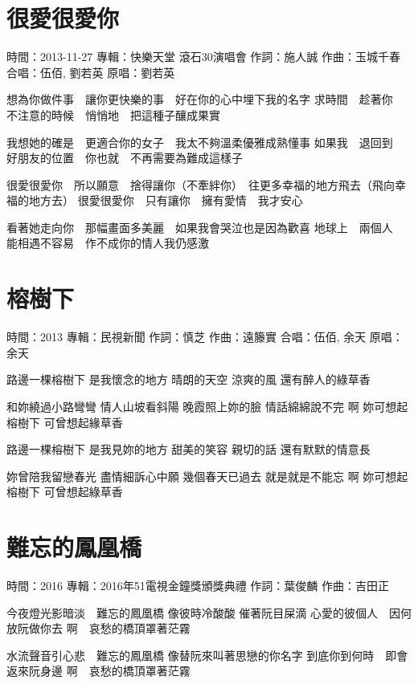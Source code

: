 \documentclass[UTF8,a4paper,oneside,twocolumn,12pt]{ctexbook}
\newcommand{\infopair}[2]{\textbullet #1：#2}
\newcommand{\zc}[1][伍佰]{\infopair{作詞}{#1}}
\newcommand{\zq}[1][伍佰]{\infopair{作曲}{#1}}
\newcommand{\zj}[1]{\infopair{專輯}{#1}}
\newcommand{\yc}[1]{\infopair{原唱}{#1}}
\newcommand{\sj}[1]{\infopair{時間}{#1}}
\newenvironment{info}{\begin{flushleft}\kaishu
	}
	{\end{flushleft}\normalsize\yahei\par}
\newenvironment{lyric}{
	}
{}
\begin{document}
\section{很愛很愛你}
\begin{info}
	\sj{2013-11-27}
	\zj{快樂天堂 滾石30演唱會}
	\zc[施人誠]
	\zq[玉城千春]
	\infopair{合唱}{伍佰, 劉若英}
	\yc{劉若英}
\end{info}
\begin{lyric}
	想為你做件事　讓你更快樂的事　好在你的心中埋下我的名字
	求時間　趁著你　不注意的時候　悄悄地　把這種子釀成果實

	我想她的確是　更適合你的女子　我太不夠溫柔優雅成熟懂事
	如果我　退回到　好朋友的位置　你也就　不再需要為難成這樣子

	很愛很愛你　所以願意　捨得讓你（不牽絆你）　往更多幸福的地方飛去（飛向幸福的地方去）
	很愛很愛你　只有讓你　擁有愛情　我才安心

	看著她走向你　那幅畫面多美麗　如果我會哭泣也是因為歡喜
	地球上　兩個人　能相遇不容易　作不成你的情人我仍感激
\end{lyric}

\section{榕樹下}%
\begin{info}
	\sj{2013}
	\zj{民視新聞}
	\zc[慎芝]
	\zq[遠籐實]
	\infopair{合唱}{伍佰, 余天}
	\yc{余天}
\end{info}
\begin{lyric}
	路邊一棵榕樹下 是我懷念的地方
	晴朗的天空 涼爽的風 還有醉人的綠草香

	和妳繞過小路彎彎 情人山坡看斜陽
	晚霞照上妳的臉 情話綿綿說不完 啊
	妳可想起榕樹下 可曾想起緣草香

	路邊一棵榕樹下 是我見妳的地方
	甜美的笑容 親切的話 還有默默的情意長

	妳曾陪我留戀春光 盡情細訴心中願
	幾個春天已過去 就是就是不能忘
	啊 妳可想起榕樹下 可曾想起綠草香
\end{lyric}

\section{難忘的鳳凰橋}
\begin{info}
	\sj{2016}
	\zj{2016年51電視金鐘獎頒獎典禮}
	\zc[葉俊麟]
	\zq[吉田正]
\end{info}
\begin{lyric}
	今夜燈光影暗淡　難忘的鳳凰橋
	像彼時冷酸酸 催著阮目屎滴
	心愛的彼個人　因何放阮做你去
	啊　哀愁的橋頂罩著茫霧

	水流聲音引心悲　難忘的鳳凰橋
	像替阮來叫著思戀的你名字
	到底你到何時　即會返來阮身邊
	啊　哀愁的橋頂罩著茫霧
\end{lyric}
\end{document}
